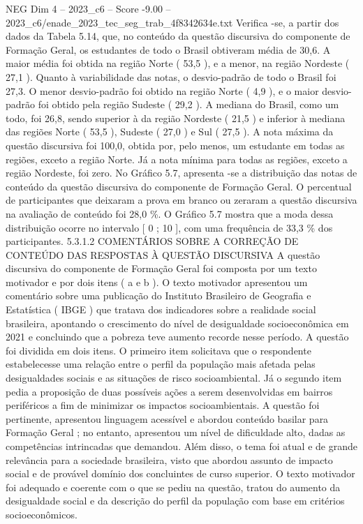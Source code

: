 \begin{textsample}{NEG Dim 4 – 2023\_c6 – Score -9.00 – 2023\_c6/enade\_2023\_tec\_seg\_trab\_4f8342634e.txt}
Verifica -se, a partir dos dados da Tabela 5.14, que, no conteúdo da questão discursiva do componente de Formação Geral, os estudantes de todo o Brasil obtiveram média de 30,6.
A maior média foi obtida na região Norte ( 53,5 ), e a menor, na região Nordeste ( 27,1 ).
Quanto à variabilidade das notas, o desvio-padrão de todo o Brasil foi 27,3.
O menor desvio-padrão foi obtido na região Norte ( 4,9 ), e o maior desvio-padrão foi obtido pela região Sudeste ( 29,2 ).
A mediana do Brasil, como um todo, foi 26,8, sendo superior à da região Nordeste ( 21,5 ) e inferior à mediana das regiões Norte ( 53,5 ), Sudeste ( 27,0 ) e Sul ( 27,5 ).
A nota máxima da questão discursiva foi 100,0, obtida por, pelo menos, um estudante em todas as regiões, exceto a região Norte.
Já a nota mínima para todas as regiões, exceto a região Nordeste, foi zero.
No Gráfico 5.7, apresenta -se a distribuição das notas de conteúdo da questão discursiva do componente de Formação Geral.
O percentual de participantes que deixaram a prova em branco ou zeraram a questão discursiva na avaliação de conteúdo foi 28,0 \%.
O Gráfico 5.7 mostra que a moda dessa distribuição ocorre no intervalo [ 0 ; 10 ], com uma frequência de 33,3 \% dos participantes. 5.3.1.2 COMENTÁRIOS SOBRE A CORREÇÃO DE CONTEÚDO DAS RESPOSTAS À QUESTÃO DISCURSIVA A questão discursiva do componente de Formação Geral foi composta por um texto motivador e por dois itens ( a e b ).
O texto motivador apresentou um comentário sobre uma publicação do Instituto Brasileiro de Geografia e Estatística ( IBGE ) que tratava dos indicadores sobre a realidade social brasileira, apontando o crescimento do nível de desigualdade socioeconômica em 2021 e concluindo que a pobreza teve aumento recorde nesse período.
A questão foi dividida em dois itens.
O primeiro item solicitava que o respondente estabelecesse uma relação entre o perfil da população mais afetada pelas desigualdades sociais e as situações de risco socioambiental.
Já o segundo item pedia a proposição de duas possíveis ações a serem desenvolvidas em bairros periféricos a fim de minimizar os impactos socioambientais.
A questão foi pertinente, apresentou linguagem acessível e abordou conteúdo basilar para Formação Geral ; no entanto, apresentou um nível de dificuldade alto, dadas as competências intrincadas que demandou.
Além disso, o tema foi atual e de grande relevância para a sociedade brasileira, visto que abordou assunto de impacto social e de provável domínio dos concluintes de curso superior.
O texto motivador foi adequado e coerente com o que se pediu na questão, tratou do aumento da desigualdade social e da descrição do perfil da população com base em critérios socioeconômicos.

\end{textsample}
